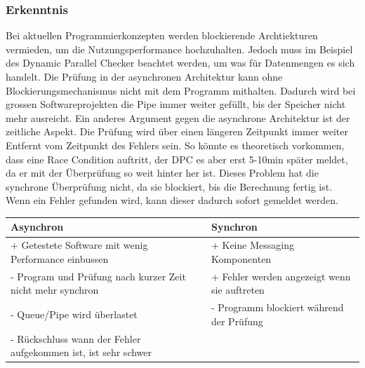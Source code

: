\documentclass[10pt,a4paper]{article}
\begin{document}
\subsubsection{Erkenntnis}
\begin{flushleft}
Bei aktuellen Programmierkonzepten werden blockierende Archtiekturen vermieden, um die Nutzungsperformance hochzuhalten. Jedoch muss im Beispiel des Dynamic Parallel Checker beachtet werden, um was für Datenmengen es sich handelt. Die Prüfung in der asynchronen Architektur kann ohne Blockierungsmechanismus nicht mit dem Programm mithalten. Dadurch wird bei grossen Softwareprojekten die Pipe immer weiter gefüllt, bis der Speicher nicht mehr ausreicht. Ein anderes Argument gegen die asynchrone Architektur ist der zeitliche Aspekt. Die Prüfung wird über einen längeren Zeitpunkt immer weiter Entfernt vom Zeitpunkt des Fehlers sein. So könnte es theoretisch vorkommen, dass eine Race Condition auftritt, der DPC es aber erst 5-10min später meldet, da er mit der Überprüfung so weit hinter her ist. Dieses Problem hat die synchrone Überprüfung nicht, da sie blockiert, bis die Berechnung fertig ist. Wenn ein Fehler gefunden wird, kann dieser dadurch sofort gemeldet werden.
\newpage
\begin{tabular}{|p{8cm}|p{8cm}|}
Asynchron & Synchron \\ 
\hline 
{\color{dkgreen} + Getestete Software mit wenig Performance einbussen}  & { \color{dkgreen}+ Keine Messaging Komponenten} \\
{\color{dkred}- Program und Prüfung nach kurzer Zeit nicht mehr synchron} & { \color{dkgreen}+ Fehler werden angezeigt wenn sie auftreten}\\
{\color{dkred}- Queue/Pipe wird überlastet} & { \color{dkred}- Programm blockiert während der Prüfung}\\
{\color{dkred}- Rückschluss wann der Fehler aufgekommen ist, ist sehr schwer}&\\
 
\hline 
\end{tabular} 
\end{flushleft}
\end{document}
